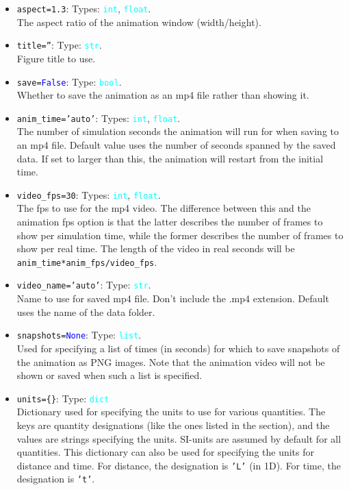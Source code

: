 \documentclass{article}
\newcommand{\ttt}[1]{\texttt{#1}}
\newcommand{\ptype}[1]{\texttt{\textcolor{cyan}{#1}}}
\newcommand{\cbl}[1]{\textcolor{blue}{#1}}
\newcommand{\cro}[1]{\textcolor{RedOrange}{#1}}
\newcommand{\cyo}[1]{\textcolor{YellowOrange}{#1}}
\begin{document}
\begin{itemize}
	\item \ttt{\cro{aspect}=1.3}: Types: \ptype{int}, \ptype{float}.\\The aspect ratio of the animation window (width/height).
	\item \ttt{\cro{title}=\cyo{''}}: Type: \ptype{str}.\\Figure title to use.
	\item \ttt{\cro{save}=\cbl{False}}: Type: \ptype{bool}.\\Whether to save the animation as an mp4 file rather than showing it.
	\item \ttt{\cro{anim\_time}=\cyo{'auto'}}: Types: \ptype{int}, \ptype{float}.\\The number of simulation seconds the animation will run for when saving to an mp4 file. Default value uses the number of seconds spanned by the saved data. If set to larger than this, the animation will restart from the initial time.
	\item \ttt{\cro{video\_fps}=30}: Types: \ptype{int}, \ptype{float}.\\The fps to use for the mp4 video. The difference between this and the animation fps option is that the latter describes the number of frames to show per simulation time, while the former describes the number of frames to show per real time. The length of the video in real seconds will be \ttt{anim\_time*anim\_fps/video\_fps}.
	\item \ttt{\cro{video\_name}=\cyo{'auto'}}: Type: \ptype{str}.\\Name to use for saved mp4 file. Don't include the .mp4 extension. Default uses the name of the data folder.
	\item \ttt{\cro{snapshots}=\cbl{None}}: Type: \ptype{list}.\\Used for specifying a list of times (in seconds) for which to save snapshots of the animation as PNG images. Note that the animation video will not be shown or saved when such a list is specified.
	\item \ttt{\cro{units}=\{\}}: Type: \ptype{dict}\\Dictionary used for specifying the units to use for various quantities. The keys are quantity designations (like the ones listed in the  section), and the values are strings specifying the units. SI-units are assumed by default for all quantities. This dictionary can also be used for specifying the units for distance and time. For distance, the designation is \ttt{'L'} (in 1D). For time, the designation is \ttt{'t'}.
\end{itemize}
\end{document}
